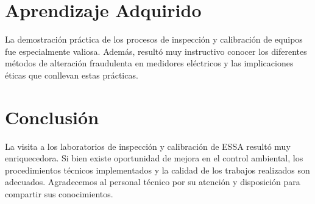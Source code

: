 \documentclass[11pt, a4paper, spanish]{article}
\begin{document}
\section*{Aprendizaje Adquirido}

La demostración práctica de los procesos de inspección y calibración de equipos fue especialmente valiosa. Además, resultó muy instructivo conocer los diferentes métodos de alteración fraudulenta en medidores eléctricos y las implicaciones éticas que conllevan estas prácticas.

\section*{Conclusión}

La visita a los laboratorios de inspección y calibración de ESSA resultó muy enriquecedora. Si bien existe oportunidad de mejora en el control ambiental, los procedimientos técnicos implementados y la calidad de los trabajos realizados son adecuados. Agradecemos al personal técnico por su atención y disposición para compartir sus conocimientos.
\end{document}
